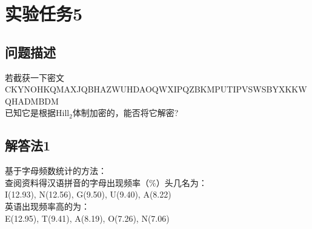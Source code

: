 \documentclass[12pt]{article}
\begin{document}
\section*{实验任务5}
\subsection*{问题描述}
若截获一下密文\\
CKYNOHKQMAXJQBHAZWUHDAOQWXIPQZBKMPUTIPVSWSBYXKKWQHADMBDM\\
已知它是根据Hill$_2$体制加密的，能否将它解密?
\subsection*{解答法1}
    基于字母频数统计的方法：\\
    查阅资料得汉语拼音的字母出现频率（\%）头几名为：\\
    I(12.93), N(12.56), G(9.50), U(9.40), A(8.22)\\
    英语出现频率高的为：\\
    E(12.95), T(9.41), A(8.19), O(7.26), N(7.06)\\
\end{document}
